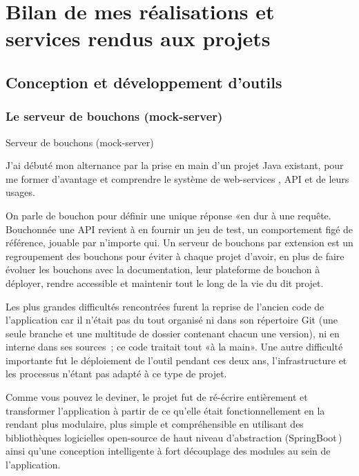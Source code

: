 \section{Bilan de mes réalisations et services rendus aux projets}
\label{p3}

    \subsection{Conception et développement d'outils}

        \subsubsection{Le serveur de bouchons (mock-server)}
        Serveur de bouchons (mock-server)

        J’ai débuté mon alternance par la prise en main d'un projet Java existant, pour me former d'avantage et comprendre le système de web-services , API et de leurs usages.

        On parle de bouchon pour définir une unique réponse «en dur à une requête.
        Bouchonnée une API revient à en fournir un jeu de test, un comportement figé de référence, jouable par n’importe qui.
        Un serveur de bouchons par extension est un regroupement des bouchons pour éviter à chaque projet d’avoir, en plus de faire évoluer les bouchons avec la documentation, leur plateforme de bouchon à déployer, rendre accessible et maintenir tout le long de la vie du dit projet.

        Les plus grandes difficultés rencontrées furent la reprise de l’ancien code de l’application car il n’était pas du tout organisé ni dans son répertoire Git (une seule branche et une multitude de dossier contenant chacun une version), ni en interne dans ses sources ; ce code traitait tout «à la main».
        Une autre difficulté importante fut le déploiement de l’outil pendant ces deux ans, l'infrastructure et les processus n'étant pas adapté à ce type de projet.

        Comme vous pouvez le deviner, le projet fut de ré-écrire entièrement et transformer l'application à partir de ce qu'elle était fonctionnellement en la rendant plus modulaire, plus simple et compréhensible en utilisant des bibliothèques logicielles open-source de haut niveau d'abstraction (SpringBoot\,) ainsi qu’une conception intelligente à fort découplage des modules au sein de l’application.

